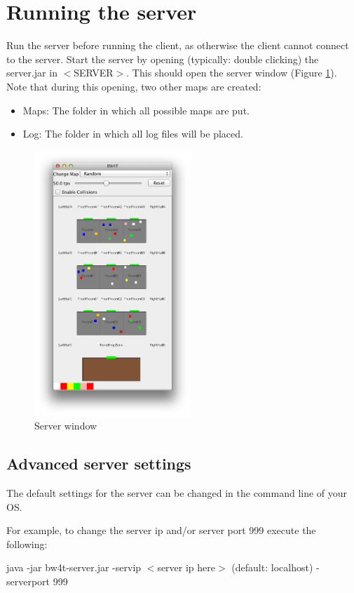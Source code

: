 \documentclass[11pt,a4paper]{article}
\begin{document}
\section{Running the server}
Run the server before running the client, as otherwise the client cannot connect to the server. Start the server by opening (typically: double clicking) the server.jar in $<$SERVER$>$. This should open the server window (Figure  \ref{fig:ServerWindow}). Note that during this opening, two other maps are created: 
\begin{itemize}
\item Maps: The folder in which all possible maps are put.
\item Log: The folder in which all log files will be placed.
\end{itemize}


\begin{figure}[!h]
\begin{center}
   \includegraphics[height=10cm]{server.png}
   \caption{Server window}\label{fig:ServerWindow}
\end{center}
\end{figure}


\subsection{Advanced server settings}
The default settings for the server can be changed in the command line of your OS. 

For example, to change the server ip and/or server port  999 execute the following:

java -jar bw4t-server.jar -servip $<$server ip here$>$ (default: localhost) -serverport 999
\end{document}
